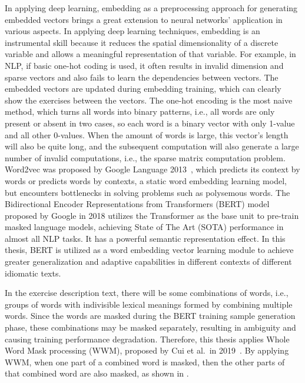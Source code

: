 In applying deep learning, embedding as a preprocessing approach for generating embedded vectors brings a great extension to neural networks' application in various aspects. In applying deep learning techniques, embedding is an instrumental skill because it reduces the spatial dimensionality of a discrete variable and allows a meaningful representation of that variable. For example, in NLP, if basic one-hot coding is used, it often results in invalid dimension and sparse vectors and also fails to learn the dependencies between vectors. The embedded vectors are updated during embedding training, which can clearly show the exercises between the vectors. The one-hot encoding is the most naive method, which turns all words into binary patterns, i.e., all words are only present or absent in two cases, so each word is a binary vector with only 1-value and all other 0-values. When the amount of words is large, this vector's length will also be quite long, and the subsequent computation will also generate a large number of invalid computations, i.e., the sparse matrix computation problem. Word2vec was proposed by Google Language 2013~\cite{church2017word2vec}, which predicts its context by words or predicts words by contexts, a static word embedding learning model, but encounters bottlenecks in solving problems such as polysemous words. The Bidirectional Encoder Representations from Transformers (BERT) model proposed by Google in 2018 utilizes the Transformer as the base unit to pre-train masked language models, achieving State of The Art (SOTA) performance in almost all NLP tasks. It has a powerful semantic representation effect. In this thesis, BERT is utilized as a word embedding vector learning module to achieve greater generalization and adaptive capabilities in different contexts of different idiomatic texts.



In the exercise description text, there will be some combinations of words, i.e., groups of words with indivisible lexical meanings formed by combining multiple words. Since the words are masked during the BERT training sample generation phase, these combinations may be masked separately, resulting in ambiguity and causing training performance degradation. Therefore, this thesis applies Whole Word Mask processing (WWM), proposed by Cui et al.\ in 2019~\cite{cui2019pre}. By applying WWM, when one part of a combined word is masked, then the other parts of that combined word are also masked, as shown in \figname{\ref{fig:ch2-bert-wwm}}.

